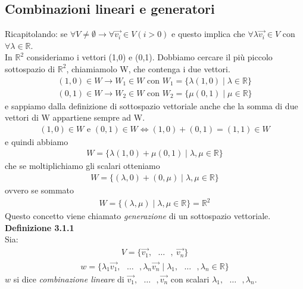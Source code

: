 \documentclass{article}
\begin{document}
\subsection{Combinazioni lineari e generatori}
Ricapitolando: se $\forall V \neq \emptyset \to \forall \vec{v_i} \in V (i > 0)$  e questo implica che $\forall \lambda \vec{v_i} \in V$ con $\forall \lambda \in \mathbb{R}$. 
\vspace{1px}  \\ In $\mathbb{R}^2$ consideriamo i vettori (1,0) e (0,1). Dobbiamo cercare il più piccolo sottospazio di $\mathbb{R}^2$, chiamiamolo W,  che contenga i due vettori.
\begin{align*}
  (1,0) \in W \to W_1 \in W \text{ con } W_1 = \{\lambda (1,0) \mid \lambda \in \mathbb{R}\} \\
  (0,1) \in W \to W_2 \in W \text{ con } W_2 = \{\mu (0,1) \mid \mu \in \mathbb{R}\} 
\end{align*}
e sappiamo dalla definizione di sottospazio vettoriale anche che la somma di due vettori di W appartiene sempre ad W.
\begin{align*}
  (1,0) \in W \text{ e } (0,1) \in W \iff (1,0)+(0,1)=(1,1) \in W
\end{align*}
e quindi abbiamo
\begin{align*}
  W = \{\lambda(1,0) + \mu(0,1) \mid \lambda,\mu \in \mathbb{R}\}
\end{align*}
che se moltiplichiamo gli scalari otteniamo
\begin{align*}
  W = \{(\lambda,0) + (0,\mu) \mid \lambda,\mu \in \mathbb{R}\}
\end{align*}
ovvero se sommato
\begin{align*}
  W = \{(\lambda, \mu) \mid \lambda,\mu \in \mathbb{R}\} = \mathbb{R}^2
\end{align*}
Questo concetto viene chiamato \textit{generazione} di un sottospazio vettoriale. 
\vspace{1em}
\\
\textbf{Definizione 3.1.1}
\\ Sia:
\begin{align*}
  V = \{ \vec{v_1}, \text{ } \dots \text{ }, \ \vec{v_n} \} 
\end{align*}
\begin{align*}
  w = \{\lambda_1 \vec{v_1}, \text{ } \dots \text{ }, \lambda_n \vec{v_n} \mid \lambda_1, \text{ } \dots \text{ }, \lambda_n \in \mathbb{R}\}
\end{align*}
$w$ si dice \textit{combinazione lineare} di $\vec{v_1}, \text{ } \dots \text{ }, \vec{v_n}$ con scalari $\lambda_1, \text{ } \dots \text{ }, \lambda_n$.
\end{document}

